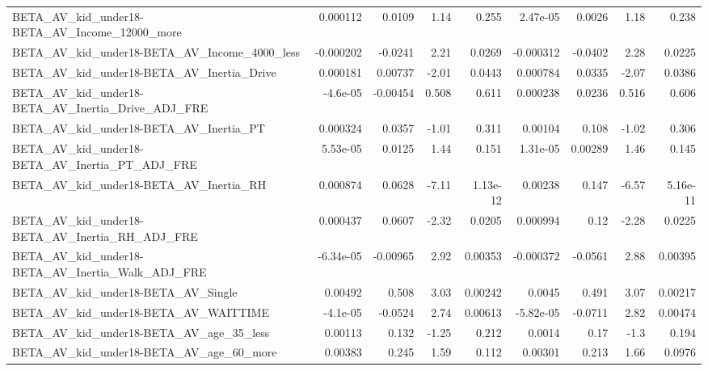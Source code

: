 \begin{tabular}{lrrrrrrrr}
BETA\_AV\_kid\_under18-BETA\_AV\_Income\_12000\_more      &    0.000112 &       0.0109 &     1.14 &    0.255 &   2.47e-05 &      0.0026 &         1.18 &         0.238 \\
BETA\_AV\_kid\_under18-BETA\_AV\_Income\_4000\_less       &   -0.000202 &      -0.0241 &     2.21 &   0.0269 &  -0.000312 &     -0.0402 &         2.28 &        0.0225 \\
BETA\_AV\_kid\_under18-BETA\_AV\_Inertia\_Drive          &    0.000181 &      0.00737 &    -2.01 &   0.0443 &   0.000784 &      0.0335 &        -2.07 &        0.0386 \\
BETA\_AV\_kid\_under18-BETA\_AV\_Inertia\_Drive\_ADJ\_FRE  &    -4.6e-05 &     -0.00454 &    0.508 &    0.611 &   0.000238 &      0.0236 &        0.516 &         0.606 \\
BETA\_AV\_kid\_under18-BETA\_AV\_Inertia\_PT             &    0.000324 &       0.0357 &    -1.01 &    0.311 &    0.00104 &       0.108 &        -1.02 &         0.306 \\
BETA\_AV\_kid\_under18-BETA\_AV\_Inertia\_PT\_ADJ\_FRE     &    5.53e-05 &       0.0125 &     1.44 &    0.151 &   1.31e-05 &     0.00289 &         1.46 &         0.145 \\
BETA\_AV\_kid\_under18-BETA\_AV\_Inertia\_RH             &    0.000874 &       0.0628 &    -7.11 & 1.13e-12 &    0.00238 &       0.147 &        -6.57 &      5.16e-11 \\
BETA\_AV\_kid\_under18-BETA\_AV\_Inertia\_RH\_ADJ\_FRE     &    0.000437 &       0.0607 &    -2.32 &   0.0205 &   0.000994 &        0.12 &        -2.28 &        0.0225 \\
BETA\_AV\_kid\_under18-BETA\_AV\_Inertia\_Walk\_ADJ\_FRE   &   -6.34e-05 &     -0.00965 &     2.92 &  0.00353 &  -0.000372 &     -0.0561 &         2.88 &       0.00395 \\
BETA\_AV\_kid\_under18-BETA\_AV\_Single                 &     0.00492 &        0.508 &     3.03 &  0.00242 &     0.0045 &       0.491 &         3.07 &       0.00217 \\
BETA\_AV\_kid\_under18-BETA\_AV\_WAITTIME               &    -4.1e-05 &      -0.0524 &     2.74 &  0.00613 &  -5.82e-05 &     -0.0711 &         2.82 &       0.00474 \\
BETA\_AV\_kid\_under18-BETA\_AV\_age\_35\_less            &     0.00113 &        0.132 &    -1.25 &    0.212 &     0.0014 &        0.17 &         -1.3 &         0.194 \\
BETA\_AV\_kid\_under18-BETA\_AV\_age\_60\_more            &     0.00383 &        0.245 &     1.59 &    0.112 &    0.00301 &       0.213 &         1.66 &        0.0976 \\

\end{tabular}
